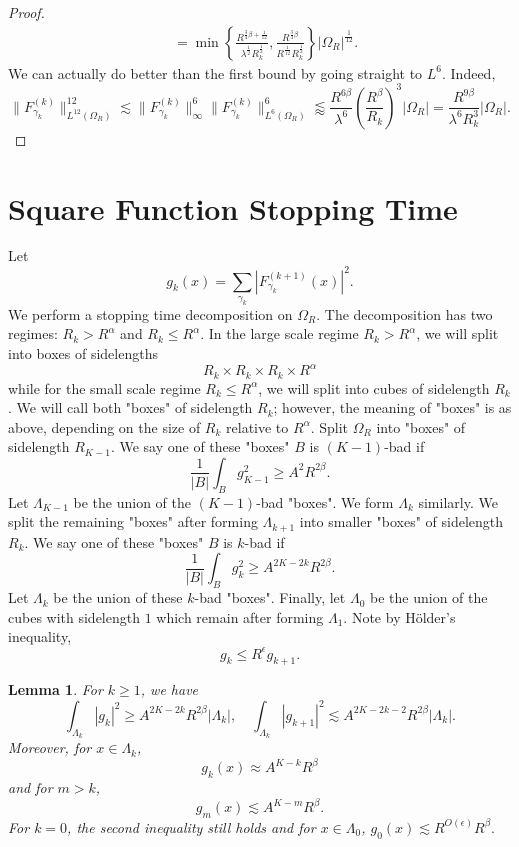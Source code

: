 \documentclass[12pt]{amsart}
\newtheorem{lemma}[theorem]{Lemma}
\begin{document}
\begin{proof}
\begin{align*}
        &=\min \left\{\frac{R^{\frac{3}{4}\beta+\frac{1}{12}}}{\lambda^{\frac{1}{2}}R_k^{\frac{1}{2}}}, \frac{R^{\frac{3}{4}\beta}}{R^{\frac{1}{12}}R_k^{\frac{1}{2}}}\right\}|\Omega_R|^{\frac{1}{12}}.
    \end{align*}
We can actually do better than the first bound by going straight to $L^6$. Indeed, $$\|F_{\gamma_k}^{(k)}\|_{L^{12}(\Omega_R)}^{12}\lesssim \|F_{\gamma_k}^{(k)}\|_{\infty}^6\|F_{\gamma_k}^{(k)}\|_{L^{6}(\Omega_R)}^6 \lessapprox \frac{R^{6\beta}}{\lambda^6}\left(\frac{R^\beta}{R_k}\right)^{3}|\Omega_R|=\frac{R^{9\beta}}{\lambda^6R_k^3}|\Omega_R|. $$
\end{proof}

\section{Square Function Stopping Time}\label{sec:stopTime}
Let $$g_k(x)=\sum_{\gamma_k}|F_{\gamma_k}^{(k+1)}(x)|^2.$$ We perform a stopping time decomposition on $\Omega_R$. The decomposition has two regimes: $R_k>R^\alpha$ and $R_k\le R^{\alpha}$. In the large scale regime $R_k>R^\alpha$, we will split into boxes of sidelengths $$R_k \times R_k \times R_k \times R^\alpha $$ while for the small scale regime $R_k\le R^\alpha$, we will split into cubes of sidelength $R_k$. We will call both "boxes" of sidelength $R_k$; however, the meaning of "boxes" is as above, depending on the size of $R_k$ relative to $R^\alpha$.
%
Split $\Omega_R$ into "boxes" of sidelength $R_{K-1}$. We say one of these "boxes" $B$ is $(K-1)$-bad if $$\frac{1}{|B|}\int_B g_{K-1}^2 \ge A^2R^{2\beta}.$$ Let $\Lambda_{K-1}$ be the union of the $(K-1)$-bad "boxes". We form $\Lambda_k$ similarly. We split the remaining "boxes" after forming $\Lambda_{k+1}$ into smaller "boxes" of sidelength $R_k$. We say one of these "boxes" $B$ is $k$-bad if \begin{equation}\label{eq:k-badDefn}
    \frac{1}{|B|}\int_B g_{k}^2 \ge A^{2K-2k}R^{2\beta}.
\end{equation} Let $\Lambda_k$ be the union of these $k$-bad "boxes". Finally, let $\Lambda_0$ be the union of the cubes with sidelength $1$ which remain after forming $\Lambda_1$. Note by H\"{o}lder's inequality, $$g_k\le R^{\epsilon} g_{k+1}.$$

\begin{lemma}\label{lem:goodbadDicotomy} For $k\ge 1$, we have
$$\int_{\Lambda_k}|g_{k}|^2\ge A^{2K-2k}R^{2\beta}|\Lambda_k|, \quad \int_{\Lambda_k}|g_{k+1}|^2\lesssim A^{2K-2k-2}R^{2\beta}|\Lambda_{k}|.$$  Moreover, for $x\in \Lambda_k$, $$g_k(x)\approx A^{K-k}R^{\beta}$$ and for $m>k$, $$g_m(x)\lesssim A^{K-m}R^\beta.$$ For $k=0$, the second inequality still holds and for $x\in \Lambda_0$, $g_0(x)\lesssim R^{O(\epsilon)}R^\beta.$ 
\end{lemma}
\end{document}
